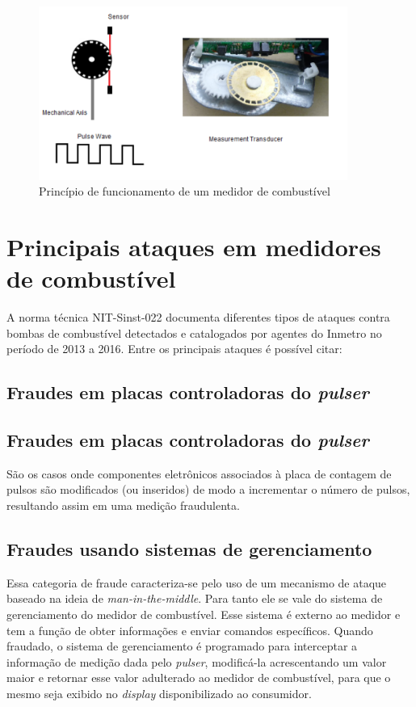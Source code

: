 \documentclass[12pt]{article}
\begin{document}
\begin{figure}[ht]
\centering
\includegraphics[width=0.9\textwidth]{transducer}
\caption{Princípio de funcionamento de um medidor de combustível}
\label{f:transducer}
\end{figure}

\section{Principais ataques em medidores de combustível}
A norma técnica NIT-Sinst-022 documenta diferentes tipos de ataques contra bombas de combustível detectados e catalogados por agentes do Inmetro no período de 2013 a 2016.
Entre os principais ataques é possível citar:

\subsection{Fraudes em placas controladoras do \textit{pulser}}


\subsection{Fraudes em placas controladoras do \textit{pulser}}
São os casos onde componentes eletrônicos associados à placa de contagem de pulsos são modificados (ou inseridos) de modo a incrementar o número de pulsos, resultando assim em uma medição fraudulenta.


\subsection{Fraudes usando sistemas de gerenciamento}
Essa categoria de fraude caracteriza-se pelo uso de um mecanismo de ataque baseado na ideia de \textit{man-in-the-middle}.
Para tanto ele se vale do sistema de gerenciamento do medidor de combustível.
Esse sistema é externo ao medidor e tem a função de obter informações e enviar comandos específicos.
Quando fraudado, o sistema de gerenciamento é programado para interceptar a informação de medição dada pelo \textit{pulser}, modificá-la acrescentando um valor maior e retornar esse valor adulterado ao medidor de combustível, para que o mesmo seja exibido no \textit{display} disponibilizado ao consumidor.
\end{document}

